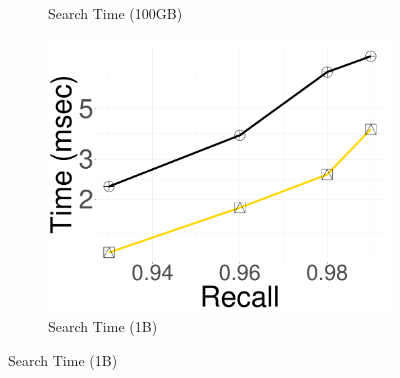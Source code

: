 \begin{figure}[htbp]
\begin{subfigure}[b]{0.28\textwidth}
        \caption{Search Time (100GB)}
        \label{fig:SPQ:100GB_Time}
    \end{subfigure}
    \hspace{0.4cm}
    \begin{subfigure}[b]{0.28\textwidth}
        \captionsetup{justification=centering}
	\centering	
        \includegraphics[width=\textwidth]{../img/oigas/PQVSPQS/1B/deep_10_Time.pdf}
        \caption{Search Time (1B)}
        \label{fig:SPQ:1B_Time}
    \end{subfigure}
    

\end{figure}
